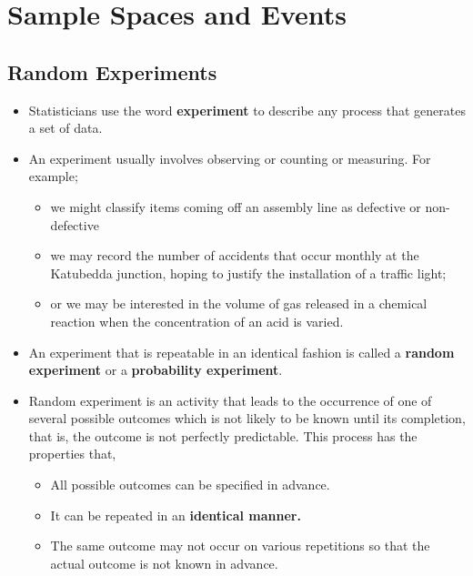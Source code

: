 \documentclass[]{book}
\providecommand{\tightlist}{%
  \setlength{\itemsep}{0pt}\setlength{\parskip}{0pt}}
\begin{document}
\hypertarget{sample-spaces-and-events}{%
\section{Sample Spaces and Events}\label{sample-spaces-and-events}}

\hypertarget{random-experiments}{%
\subsection{Random Experiments}\label{random-experiments}}

\begin{itemize}
\tightlist
\item
  Statisticians use the word \textbf{experiment} to describe any process that generates a set of data.
\item
  An experiment usually involves observing or counting or measuring. For example;

  \begin{itemize}
  \tightlist
  \item
    we might classify items coming off an assembly line as defective or non-defective
  \item
    we may record the number of accidents that occur monthly at the Katubedda junction, hoping to justify the installation of a traffic light;
  \item
    or we may be interested in the volume of gas released in a chemical reaction when the concentration of an acid is varied.
  \end{itemize}
\item
  An experiment that is repeatable in an identical fashion is called a \textbf{random experiment} or a \textbf{probability experiment}.
\item
  Random experiment is an activity that leads to the occurrence of one of several possible outcomes which is not likely to be known until its completion, that is, the outcome is not perfectly predictable. This process has the properties that,

  \begin{itemize}
  \tightlist
  \item
    All possible outcomes can be specified in advance.
  \item
    It can be repeated in an \textbf{identical manner.}
  \item
    The same outcome may not occur on various repetitions so that the actual outcome is not known in advance.
  \end{itemize}
\end{itemize}
\end{document}
